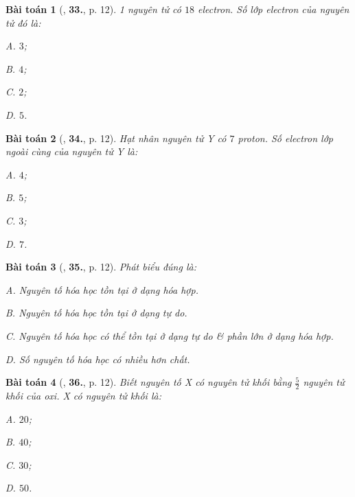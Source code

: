 \documentclass{article}
\numberwithin{equation}{section}
\newtheorem{baitoan}{Bài toán}[section]
\begin{document}
\begin{baitoan}[\cite{An2011}, \textbf{33.}, p. 12]
	1 nguyên tử có $18$ electron. Số lớp electron của nguyên tử đó là:
	\begin{enumerate*}
		\item[{\rm\sf A.}] $3$;
		\item[{\rm\sf B.}] $4$;
		\item[{\rm\sf C.}] $2$;
		\item[{\rm\sf D.}] $5$.
	\end{enumerate*}
\end{baitoan}

\begin{baitoan}[\cite{An2011}, \textbf{34.}, p. 12]
	Hạt nhân nguyên tử Y có $7$ proton. Số electron lớp ngoài cùng của nguyên tử Y là:
	\begin{enumerate*}
		\item[{\rm\sf A.}] $4$;
		\item[{\rm\sf B.}] $5$;
		\item[{\rm\sf C.}] $3$;
		\item[{\rm\sf D.}] $7$.
	\end{enumerate*}
\end{baitoan}

\begin{baitoan}[\cite{An2011}, \textbf{35.}, p. 12]
	Phát biểu đúng là:
	\begin{enumerate*}
		\item[{\rm\sf A.}] Nguyên tố hóa học tồn tại ở dạng hóa hợp.
		\item[{\rm\sf B.}] Nguyên tố hóa học tồn tại ở dạng tự do.
		\item[{\rm\sf C.}] Nguyên tố hóa học có thể tồn tại ở dạng tự do \& phần lớn ở dạng hóa hợp.
		\item[{\rm\sf D.}] Số nguyên tố hóa học có nhiều hơn chất.
	\end{enumerate*}
\end{baitoan}

\begin{baitoan}[\cite{An2011}, \textbf{36.}, p. 12]
	Biết nguyên tố X có nguyên tử khối bằng $\frac{5}{2}$ nguyên tử khối của oxi. X có nguyên tử khối là:
	\begin{enumerate*}
		\item[{\rm\sf A.}] $20$;
		\item[{\rm\sf B.}] $40$;
		\item[{\rm\sf C.}] $30$;
		\item[{\rm\sf D.}] $50$.
	\end{enumerate*}
\end{baitoan}
\end{document}
